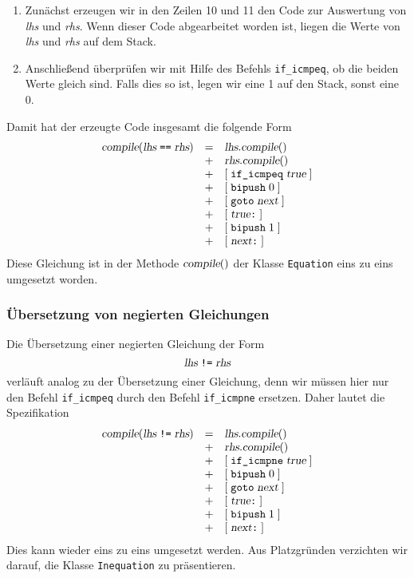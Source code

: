 \begin{enumerate}
\item Zun\"achst erzeugen wir in den Zeilen 10 und 11 den Code zur Auswertung von \textsl{lhs} und \textsl{rhs}.
      Wenn dieser Code abgearbeitet worden ist, liegen die Werte von \textsl{lhs} und \textsl{rhs}
      auf dem Stack.
\item Anschlie{\ss}end \"uberpr\"ufen wir mit Hilfe des Befehls \texttt{if\_icmpeq}, ob die beiden Werte
      gleich sind.  Falls dies so ist, legen wir eine 1 auf den Stack, sonst eine 0.
\end{enumerate}
Damit hat der erzeugte Code insgesamt die folgende Form
\[
   \begin{array}[t]{lcl}
   \textsl{compile}(\textsl{lhs}\;\texttt{==}\;\textsl{rhs}) & = & 
         \textsl{lhs}.\textsl{compile}()  \\
   & + & \textsl{rhs}.\textsl{compile}()  \\
   & + & [ \;\texttt{if\_icmpeq}\; \textsl{true} \; ]  \\
   & + & [ \;\texttt{bipush}\;0\; ]  \\
   & + & [ \;\texttt{goto}\;\textsl{next}\; ]  \\
   & + & [ \;\textsl{true}\texttt{:}\; ]  \\
   & + & [ \;\texttt{bipush}\;1\; ]  \\
   & + & [ \;\textsl{next}\texttt{:}\; ]  \\
   \end{array}
\]
Diese Gleichung ist in der Methode $\textsl{compile}()$ der Klasse \texttt{Equation} eins zu eins umgesetzt worden.

\subsubsection{\"Ubersetzung von negierten Gleichungen}
Die \"Ubersetzung einer negierten Gleichung der Form
\[ \textsl{lhs}\;\texttt{!=}\;\textsl{rhs} \]
verl\"auft analog zu der \"Ubersetzung einer Gleichung, denn wir m\"ussen hier nur den Befehl \texttt{if\_icmpeq}
durch den Befehl \texttt{if\_icmpne} ersetzen.  Daher lautet die Spezifikation
\[
   \begin{array}[t]{lcl}
   \textsl{compile}(\textsl{lhs}\;\texttt{!=}\;\textsl{rhs}) & = & 
         \textsl{lhs}.\textsl{compile}()  \\
   & + & \textsl{rhs}.\textsl{compile}()  \\
   & + & [ \;\texttt{if\_icmpne}\; \textsl{true} \; ]  \\
   & + & [ \;\texttt{bipush}\;0\; ]  \\
   & + & [ \;\texttt{goto}\;\textsl{next}\; ]  \\
   & + & [ \;\textsl{true}\texttt{:}\; ]  \\
   & + & [ \;\texttt{bipush}\;1\; ]  \\
   & + & [ \;\textsl{next}\texttt{:}\; ]  \\
   \end{array}
\]
Dies kann wieder eins zu eins umgesetzt werden.  Aus Platzgr\"unden verzichten wir darauf, die Klasse 
\texttt{Inequation} zu pr\"asentieren.


